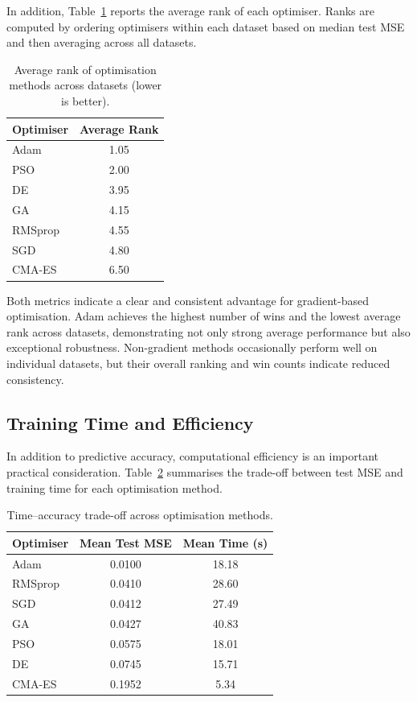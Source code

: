 \documentclass[a4paper,12pt,oneside]{article}
\begin{document}
In addition, Table~\ref{tab:average_rank} reports the average rank of each optimiser. Ranks are computed by ordering optimisers within each dataset based on median test MSE and then averaging across all datasets.

\begin{table}[H]
\centering
\caption{Average rank of optimisation methods across datasets (lower is better).}
\label{tab:average_rank}
\begin{tabular}{lc}
\toprule
\textbf{Optimiser} & \textbf{Average Rank} \\
\midrule
Adam      & 1.05 \\
PSO       & 2.00 \\
DE        & 3.95 \\
GA        & 4.15 \\
RMSprop   & 4.55 \\
SGD       & 4.80 \\
CMA-ES    & 6.50 \\
\bottomrule
\end{tabular}
\end{table}

Both metrics indicate a clear and consistent advantage for gradient-based optimisation. Adam achieves the highest number of wins and the lowest average rank across datasets, demonstrating not only strong average performance but also exceptional robustness. Non-gradient methods occasionally perform well on individual datasets, but their overall ranking and win counts indicate reduced consistency.

\subsection{Training Time and Efficiency}

In addition to predictive accuracy, computational efficiency is an important practical consideration. Table~\ref{tab:time_accuracy} summarises the trade-off between test MSE and training time for each optimisation method.

\begin{table}[H]
\centering
\caption{Time--accuracy trade-off across optimisation methods.}
\label{tab:time_accuracy}
\begin{tabular}{lcc}
\toprule
\textbf{Optimiser} & \textbf{Mean Test MSE} & \textbf{Mean Time (s)} \\
\midrule
Adam      & 0.0100 & 18.18 \\
RMSprop   & 0.0410 & 28.60 \\
SGD       & 0.0412 & 27.49 \\
GA        & 0.0427 & 40.83 \\
PSO       & 0.0575 & 18.01 \\
DE        & 0.0745 & 15.71 \\
CMA-ES    & 0.1952 & 5.34  \\
\bottomrule
\end{tabular}
\end{table}
\end{document}
